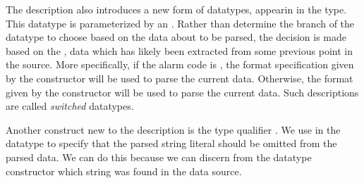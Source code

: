 The \darkstar{} description also introduces a new form of datatypes,
appearin in the  type.  This datatype is parameterized by an
.  Rather than determine the branch of the datatype to
choose based on the data about to be parsed, the decision is made
based on the , data which has likely been extracted
from some previous point in the source.  More specifically, if the
alarm code is , the format specification given by the
 constructor will be used to parse the current data.
Otherwise, the format given by the  constructor will be
used to parse the current data. Such descriptions are called
\textit{switched} datatypes.

Another construct new to the \darkstar{} description is the type qualifier
. We use  in the  datatype to specify
that the parsed string literal should be omitted from the parsed
data. We can do this because we can discern from the datatype constructor
which string was found in the data source.

